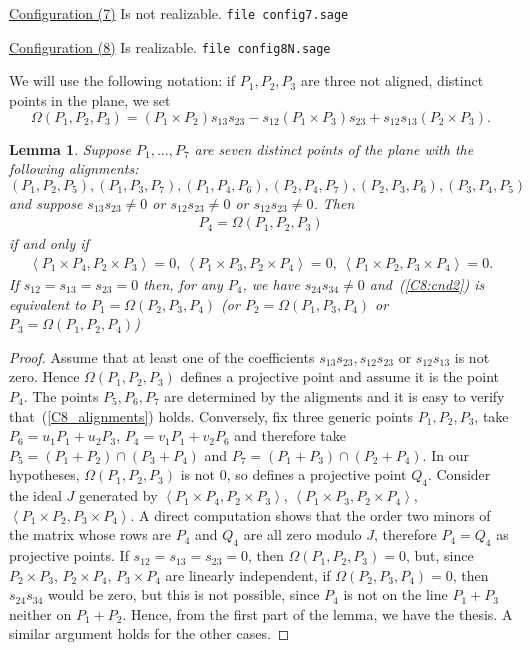 \documentclass{amsart}
\theoremstyle{plain}
\newtheorem{lemma}{Lemma}[section]
\theoremstyle{definition}
\newcommand{\scl}[2]{\left\langle {#1}, {#2} \right\rangle}
\begin{document}


\underline{Configuration (7)} Is not realizable.
\verb+file config7.sage+



\underline{Configuration (8)} Is realizable.
\verb+file config8N.sage+

We will use the following notation:
if $P_1, P_2, P_3$ are three not aligned, distinct points in the plane,
we set
\[
\Omega(P_1, P_2, P_3) = (P_1 \times P_2)s_{13}s_{23} -
  s_{12}(P_1 \times P_3)s_{23} + s_{12}s_{13}(P_2 \times P_3).
\]

\begin{lemma}
  Suppose $P_1, \dots, P_7$ are seven distinct points of the plane with the
  following alignments:
\begin{equation}
  \label{C8_alignments}
(P_1, P_2, P_5), (P_1, P_3, P_7), (P_1, P_4, P_6), (P_2, P_4, P_7),
(P_2, P_3, P_6),(P_3, P_4, P_5)
\end{equation}
and suppose $s_{13}s_{23} \not = 0$ or $s_{12}s_{23} \not = 0$ or
$s_{12}s_{23} \not = 0$.
Then
\begin{gather}
P_4 = \Omega(P_1, P_2, P_3)
  \label{C8:cnd1}
\end{gather}
if and only if
\begin{gather}
  \label{C8:cnd2}
  \scl{P_1\times P_4}{P_2 \times P_3} = 0,\
  \scl{P_1\times P_3}{P_2 \times P_4} = 0,\
  \scl{P_1\times P_2}{P_3 \times P_4} = 0.
\end{gather}
If $s_{12} = s_{13} = s_{23} = 0$ then, for any $P_4$, we have 
$s_{24} s_{34} \not = 0$ and~(\ref{C8:cnd2}) is equivalent to
$P_1 = \Omega(P_2, P_3, P_4)$ (or $P_2 = \Omega(P_1, P_3, P_4)$
or $P_3 = \Omega(P_1, P_2, P_4)$)
\end{lemma}
\begin{proof}
Assume that at least one of the coefficients $s_{13}s_{23}, s_{12}s_{23}$
or $s_{12}s_{13}$ is not zero. Hence $\Omega(P_1, P_2, P_3)$ defines a
projective point and assume it is the point $P_4$. The points $P_5, P_6, P_7$
are determined by the aligments and it is easy to verify
that~(\ref{C8_alignments}) holds.
Conversely, fix three generic points $P_1, P_2, P_3$, take
$P_6 = u_1P_1+u_2P_3$, $P_4 = v_1P_1+v_2P_6$ and therefore take
$P_5 = (P_1+P_2) \cap (P_3+P_4)$ and $P_7 = (P_1+P_3) \cap (P_2+P_4)$.
In our hypotheses, $\Omega(P_1, P_2, P_3)$ is not $0$,
so defines a projective point $Q_4$.  Consider the ideal $J$ generated
by $\scl{P_1\times P_4}{P_2\times P_3}$,
$\scl{P_1\times P_3}{P_2\times P_4}$,
$\scl{P_1\times P_2}{P_3\times P_4}$. A direct computation shows that
the order two minors of the matrix whose rows are $P_4$ and $Q_4$ are all
zero modulo $J$, therefore $P_4 = Q_4$ as projective points.
If $s_{12} = s_{13} = s_{23} = 0$, then $\Omega(P_1, P_2, P_3) = 0$,
but, since $P_2 \times P_3$, $P_2 \times P_4$, $P_3 \times P_4$ are linearly
independent, if $\Omega(P_2, P_3, P_4) = 0$, then $s_{24}s_{34}$ would be
zero, but this is not possible, since $P_4$ is not on the line $P_1+P_3$
neither on $P_1+P_2$. Hence, from the first part of the lemma, we have the
thesis. A similar argument holds for the other cases.
\end{proof}
\end{document}
